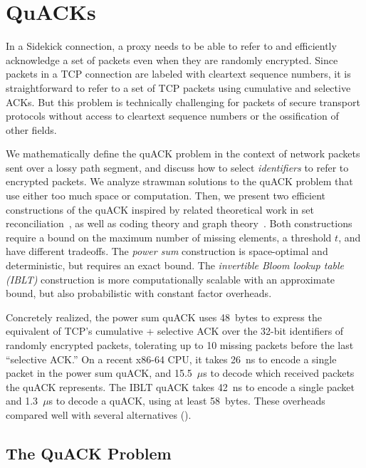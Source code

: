 \chapter{QuACKs}
\label{sec:quack}

In a Sidekick connection, a proxy needs to be able to refer to and efficiently
acknowledge a set of packets even when they are randomly encrypted. Since
packets in a TCP connection are labeled with cleartext sequence numbers, it is
straightforward to refer to a set of TCP packets using cumulative and selective
ACKs. But this problem is technically challenging for packets of secure
transport protocols without access to cleartext sequence numbers or the
ossification of other fields.

We mathematically define the quACK problem in the context of network packets
sent over a lossy path segment, and discuss how to select \emph{identifiers} to
refer to encrypted packets. We analyze strawman solutions to the quACK problem
that use either too much space or computation. Then, we present two efficient
constructions of the quACK inspired by related theoretical work in set
reconciliation~\cite{minsky2003set,eppstein2011straggler}, as well as coding
theory and graph theory~\cite{karpovsky2003data}. Both constructions require a
bound on the maximum number of missing elements, a threshold $t$, and have
different tradeoffs. The \textit{power sum} construction is space-optimal and
deterministic, but requires an exact bound. The \textit{invertible Bloom lookup
table (IBLT)} construction is more computationally scalable with an approximate
bound, but also probabilistic with constant factor overheads.

Concretely realized, the power sum quACK uses 48~bytes to express the equivalent
of TCP's cumulative + selective ACK over the 32-bit identifiers of randomly
encrypted packets, tolerating up to 10 missing packets before the last
``selective ACK.'' On a recent x86-64 CPU, it takes 26~ns to encode a single
packet in the power sum quACK, and 15.5~$\mu$s to decode which received packets
the quACK represents. The IBLT quACK takes 42~ns to encode a single packet and
1.3~$\mu$s to decode a quACK, using at least 58~bytes. These overheads compared
well with several alternatives
().

\section{The QuACK Problem}
\label{sec:quack:problem}

